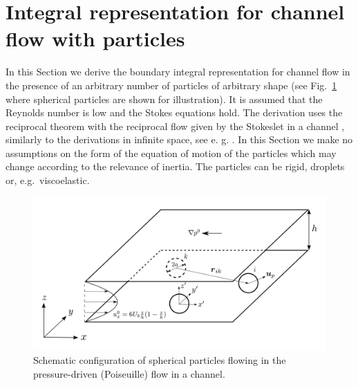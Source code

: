 \section{Integral representation for channel flow with particles}

In this Section we derive the boundary integral representation for channel flow in the presence of an arbitrary number of particles of arbitrary shape (see Fig.\ \ref{fig: setup} where spherical particles are shown for illustration). It is assumed that the Reynolds number is low and the Stokes equations hold. The
derivation uses the reciprocal theorem with the reciprocal flow given by the Stokeslet in a channel \cite{LironMochon}, similarly to the derivations in infinite space, see e. g. \cite{ps}.
In this Section we make no assumptions on the form of the equation of motion of the particles which may change according to the relevance of inertia. The particles can be rigid, droplets or, e.g.\ viscoelastic.

\begin{figure}[t!]
 \begin{center}
\includegraphics[width=.9\columnwidth]{channel_sphere3.pdf}
\end{center}
  \caption{Schematic configuration of spherical particles flowing in the pressure-driven (Poiseuille) flow in a channel.}
 \label{fig: setup}
\end{figure}


